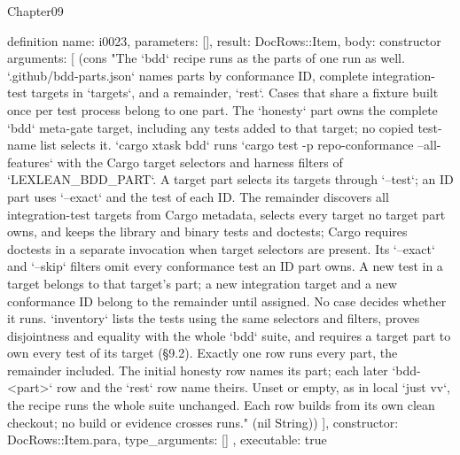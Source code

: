 \begin{lexlean}{Chapter09}
\begin{semanticmodule}
definition{
  name: i0023,
  parameters: [],
  result: DocRows::Item,
  body: constructor{
    arguments: [
      (cons "The `bdd` recipe runs as the parts of one run as well. `.github/bdd-parts.json` names parts by conformance ID, complete integration-test targets in `targets`, and a remainder, `rest`. Cases that share a fixture built once per test process belong to one part. The `honesty` part owns the complete `bdd` meta-gate target, including any tests added to that target; no copied test-name list selects it. `cargo xtask bdd` runs `cargo test -p repo-conformance --all-features` with the Cargo target selectors and harness filters of `LEXLEAN_BDD_PART`. A target part selects its targets through `--test`; an ID part uses `--exact` and the test of each ID. The remainder discovers all integration-test targets from Cargo metadata, selects every target no target part owns, and keeps the library and binary tests and doctests; Cargo requires doctests in a separate invocation when target selectors are present. Its `--exact` and `--skip` filters omit every conformance test an ID part owns. A new test in a target belongs to that target's part; a new integration target and a new conformance ID belong to the remainder until assigned. No case decides whether it runs. `inventory` lists the tests using the same selectors and filters, proves disjointness and equality with the whole `bdd` suite, and requires a target part to own every test of its target (§9.2). Exactly one row runs every part, the remainder included. The initial honesty row names its part; each later `bdd-<part>` row and the `rest` row name theirs. Unset or empty, as in local `just vv`, the recipe runs the whole suite unchanged. Each row builds from its own clean checkout; no build or evidence crosses runs." (nil String))
    ],
    constructor: DocRows::Item.para,
    type_arguments: []
  },
  executable: true
}


\end{semanticmodule}
\end{lexlean}
